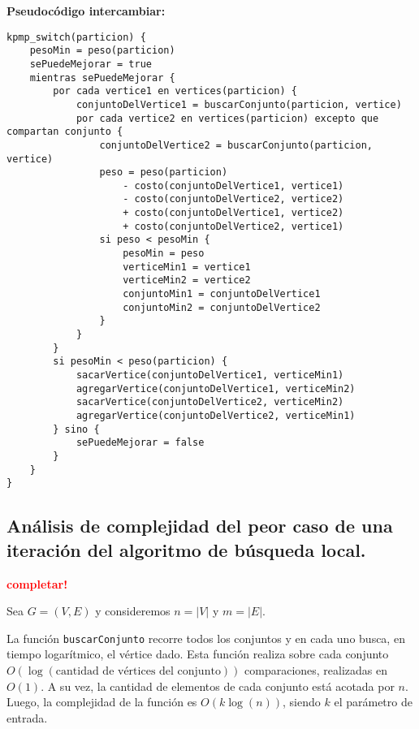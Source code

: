 \newpage

\textbf{Pseudocódigo intercambiar:}

\vspace*{0.3cm}

\begin{verbatim}
kpmp_switch(particion) {
    pesoMin = peso(particion)
    sePuedeMejorar = true
    mientras sePuedeMejorar {
        por cada vertice1 en vertices(particion) {
            conjuntoDelVertice1 = buscarConjunto(particion, vertice)
            por cada vertice2 en vertices(particion) excepto que compartan conjunto {
                conjuntoDelVertice2 = buscarConjunto(particion, vertice)
                peso = peso(particion)
                    - costo(conjuntoDelVertice1, vertice1)
                    - costo(conjuntoDelVertice2, vertice2)
                    + costo(conjuntoDelVertice1, vertice2)
                    + costo(conjuntoDelVertice2, vertice1)
                si peso < pesoMin {
                    pesoMin = peso
                    verticeMin1 = vertice1
                    verticeMin2 = vertice2
                    conjuntoMin1 = conjuntoDelVertice1
                    conjuntoMin2 = conjuntoDelVertice2
                }
            }
        }
        si pesoMin < peso(particion) {
            sacarVertice(conjuntoDelVertice1, verticeMin1)
            agregarVertice(conjuntoDelVertice1, verticeMin2)
            sacarVertice(conjuntoDelVertice2, verticeMin2)
            agregarVertice(conjuntoDelVertice2, verticeMin1)
        } sino {
            sePuedeMejorar = false
        }
    }
}
\end{verbatim}



\newpage
\subsection{Análisis de complejidad del peor caso de una iteración del
            algoritmo de búsqueda local.}
\vspace*{0.3cm}
\textcolor{red}{\textbf{completar!}}

Sea $G = (V,E)$ y consideremos $n = |V|$ y $m = |E|$.

La función \texttt{buscarConjunto} recorre todos los conjuntos y en cada uno
busca, en tiempo logarítmico, el vértice dado. Esta función realiza sobre cada
conjunto $O(\log(\text{cantidad de vértices del conjunto}))$ comparaciones,
realizadas en $O(1)$. A su vez, la cantidad de elementos de cada conjunto está
acotada por $n$. Luego, la complejidad de la función es $O(k\log(n))$, siendo
$k$ el parámetro de entrada.

